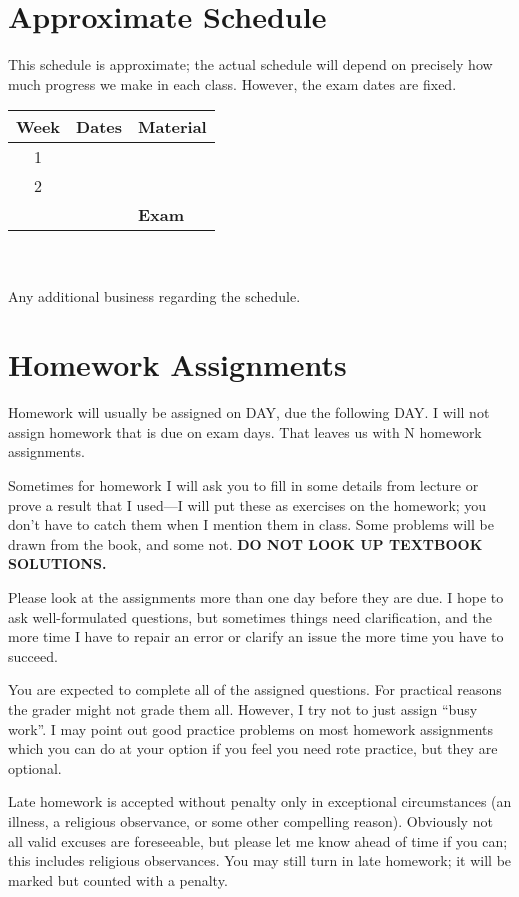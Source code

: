 \clearpage
\section*{Approximate Schedule}

This schedule is approximate; the actual schedule will depend on precisely how much progress we make in each class.  However, the exam dates are fixed.

\begin{tabular}{clp{}}
	Week	&	Dates				&	Material \\\hline
	1		&&	\\
	2		&&	\\
			&&	{\bf Exam}
\end{tabular}
\\
\\
Any additional business regarding the schedule.

\clearpage
\section*{Homework Assignments}

Homework will usually be assigned on DAY, due the following DAY.
I will not assign homework that is due on exam days.
That leaves us with N homework assignments.

Sometimes for homework I will ask you to fill in some details from lecture or prove a result that I used---I will put these as exercises on the homework; you don't have to catch them when I mention them in class.
Some problems will be drawn from the book, and some not.
{\bf DO NOT LOOK UP TEXTBOOK SOLUTIONS.}

Please look at the assignments more than one day before they are due.
I hope to ask well-formulated questions, but sometimes things need clarification, and the more time I have to repair an error or clarify an issue the more time you have to succeed.

You are expected to complete all of the assigned questions.
For practical reasons the grader might not grade them all.
However, I try not to just assign ``busy work''.
I may point out good practice problems on most homework assignments which you can do at your option if you feel you need rote practice, but they are optional.

Late homework is accepted without penalty only in exceptional circumstances (an illness, a religious observance, or some other compelling reason).
Obviously not all valid excuses are foreseeable, but please let me know ahead of time if you can; this includes religious observances.
You may still turn in late homework; it will be marked but counted with a penalty.

